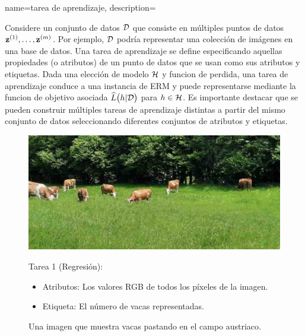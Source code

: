 {name={tarea de aprendizaje},
description={Considere un conjunto de datos $\mathcal{D}$ que consiste en múltiples puntos de datos ${\bf z}^{(1)},\ldots,{\bf z}^{(m)}$. 
Por ejemplo, $\mathcal{D}$ podría representar una colección de imágenes en una base de datos. 
Una tarea de aprendizaje se define especificando aquellas propiedades (o atributos) de un punto de datos que se usan como sus atributos y etiquetas. 
Dada una elección de modelo $\mathcal{H}$ y funcion de perdida, una tarea de aprendizaje conduce a una instancia de ERM y puede representarse mediante la funcion de objetivo asociada $\widehat{L}\big(h|\mathcal{D}\big)$ para $h \in \mathcal{H}$. 
Es importante destacar que se pueden construir múltiples tareas de aprendizaje distintas a partir del mismo conjunto de datos seleccionando diferentes conjuntos de atributos y etiquetas. 
\begin{figure}[H]
\centering
\begin{minipage}[t]{0.95\textwidth}
    \centering
    \includegraphics[width=\textwidth]{../../assets/CowsAustria.jpg}
    \caption*{Una imagen que muestra vacas pastando en el campo austriaco.}
    \vspace{5mm}
\end{minipage}
\vspace{5mm}
\begin{minipage}[t]{0.45\textwidth}
    Tarea 1 (Regresión):
    \begin{itemize}
        \item Atributos: Los valores RGB de todos los píxeles de la imagen.
        \item Etiqueta: El número de vacas representadas.
    \end{itemize}
\end{minipage}
\hfill
\begin{minipage}[t]{0.45\textwidth}

\end{minipage}
\end{figure}}}
